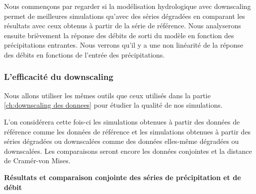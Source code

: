 \documentclass[a4paper,11pt]{article}
\numberwithin{equation}{section}
\begin{document}
Nous commençons par regarder si la modélisation hydrologique avec downscaling permet de meilleures simulations qu'avec des séries dégradées en comparant les résultats avec ceux obtenus à partir de la série de référence. Nous analyserons ensuite brièvement la réponse des débits de sorti du modèle en fonction des précipitations entrantes. Nous verrons qu'il y a une non linéarité de la réponse des débits en fonctions de l'entrée des précipitations.
 
\subsubsection{L'efficacité du downscaling}

Nous allons utiliser les mêmes outils que ceux utilisés dans la partie \ref{ch:downscaling des donnees} pour étudier la qualité de nos simulations.

L'on considérera cette fois-ci les simulations obtenues à partir des données de référence comme les données de référence et les simulations obtenues à partir des séries dégradées ou downscalées comme des données elles-même dégradées ou downscalées. Les comparaisons seront encore les données conjointes et la distance de Cramér-von Mises.

\vspace{0.7 cm}

\noindent\textbf{Résultats et comparaison conjointe des séries de précipitation et de débit}
\end{document}
